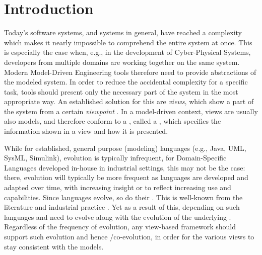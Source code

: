 \section{Introduction}
\label{sec:Introduction}

Today's software systems, and systems in general, have reached a complexity which
makes it nearly impossible to comprehend the entire system at once.
This is especially the case when, e.g., in the development of Cyber-Physical Systems,
developers from multiple domains are working together on the same system.
Modern Model-Driven Engineering tools therefore need to provide abstractions of the modeled system.
In order to reduce the accidental complexity for a specific task, tools should present only the necessary part of the system in the most appropriate way.
An established solution for this are \emph{views}, which show a part of the system from a certain \emph{viewpoint} \cite{atkinson_orthographic_2010}.
In a model-driven context, views are usually also models, and therefore conform to a \metamodel,
called a \emph{\viewtype} \cite{goldschmidt_towards_2012}, which specifies 
the information shown in a view and how it is presented.

While for established, general purpose (modeling) languages (e.g., Java, UML, SysML, Simulink), evolution is typically infrequent, for Domain-Specific Languages developed in-house in industrial settings, this may not be the case: there, evolution will typically be more frequent as languages are developed and adapted over time, with increasing insight or to reflect increasing use and capabilities.
Since languages evolve, so do their \metamodels. This is well-known from the literature and industrial practice \cite{durisic_evolution_2014,Hebig2017}. Yet as a result of this, \viewtypes depending on such languages and \metamodels need to evolve along with the evolution of the underlying \metamodels. Regardless of the frequency of \metamodel evolution, any view-based framework should support such evolution and hence \metamodel/\viewtype co-evolution, in order for the various views to stay consistent with the models. 

